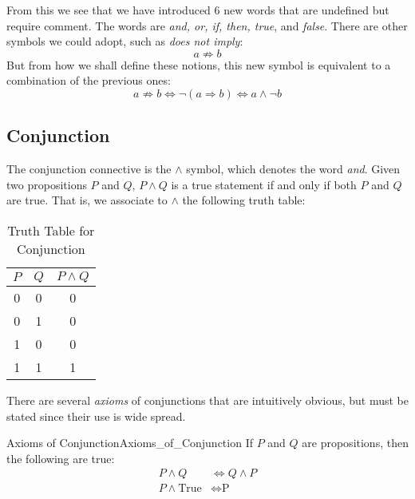     From this we see that we have introduced 6 new words that are undefined but
    require comment. The words are \textit{and, or, if, then, true}, and
    \textit{false}. There are other symbols we could adopt, such as
    \textit{does not imply}:
    \begin{equation*}
        a\not\Rightarrow{b}
    \end{equation*}
    But from how we shall define these notions, this new symbol is equivalent to
    a combination of the previous ones:
    \begin{equation*}
        a\not\Rightarrow{b}\Longleftrightarrow
        \neg(a\Rightarrow{b})
        \Longleftrightarrow
        a\land\neg{b}
    \end{equation*}
    \subsection{Conjunction}
        The conjunction connective is the $\land$ symbol, which denotes the word
        \textit{and}. Given two propositions $P$ and $Q$, $P\land{Q}$ is a true
        statement if and only if both $P$ and $Q$ are true. That is, we
        associate to $\land$ the following truth table:
        \begin{table}[H]
            \centering
            \captionsetup{type=table}
            \begin{tabular}{ccc}
                $P$&$Q$&$P\land{Q}$\\
                \hline
                0&0&0\\
                0&1&0\\
                1&0&0\\
                1&1&1
            \end{tabular}
            \caption{Truth Table for Conjunction}
            \label{tab:Truth_Table_for_Conjunction}
        \end{table}
        There are several \textit{axioms} of conjunctions that are intuitively
        obvious, but must be stated since their use is wide spread.
        \begin{faxiom}{Axioms of Conjunction}{Axioms_of_Conjunction}
            If $P$ and $Q$ are propositions, then the following are true:
            \begin{align}
                P\land{Q}&\Longleftrightarrow{Q}\land{P}
                \tag{Commutativity of Conjunction}\\
                P\land\textrm{True}&\Longleftrightarrow\textrm{P}
                \tag{Identity of Conjunction}
            \end{align}
        \end{faxiom}
